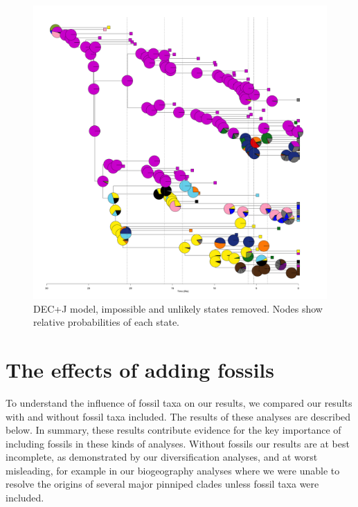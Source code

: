 \documentclass[a4paper, 12pt]{article}
\begin{document}
\begin{figure}[H]
 \centering
  \includegraphics[width = \linewidth]{figures/all-pinnipeds-DECj-unlikely-pies.png}
  \caption{DEC+J model, impossible and unlikely states removed. Nodes show relative probabilities of each state.}
  \label{fig-all-decj-pie-unlikely}
\end{figure} 


\newpage
\section{The effects of adding fossils}

To understand the influence of fossil taxa on our results, we compared our results with and without fossil taxa included. The results of these analyses are described below. In summary, these results contribute evidence for the key importance of including fossils in these kinds of analyses. Without fossils our results are at best incomplete, as demonstrated by our diversification analyses, and at worst misleading, for example in our biogeography analyses where we were unable to resolve the origins of several major pinniped clades unless fossil taxa were included.

\end{document}
